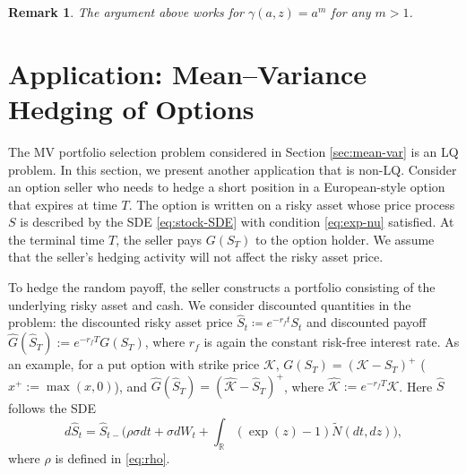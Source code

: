 \documentclass[11pt]{article}
\newtheorem{remark}{Remark}
\newcommand{\1}{\mathbbm{1}}
\begin{document}
\begin{remark}
The argument above works for $\gamma(a,z) = a^m$ for any $m >1$. %
\end{remark}

\section{Application: Mean--Variance Hedging of Options}\label{sec:MV-hedge}
The MV portfolio selection problem considered in Section \ref{sec:mean-var} is an LQ problem. In this section, we present another application that is non-LQ. Consider an option seller who needs to hedge a short position in a European-style option that expires at time $T$. The option is written on a risky asset whose price process $S$ is described by the SDE \eqref{eq:stock-SDE} with condition \eqref{eq:exp-nu} satisfied. At the terminal time $T$, the seller pays $G(S_T)$ to the option holder. We assume that the seller's hedging activity will not affect the risky asset price.

To hedge the random payoff, the seller constructs a portfolio consisting of the underlying risky asset and cash. We consider discounted quantities in the problem: the discounted risky asset price $\hat{S}_t\coloneqq e^{-r_ft}S_t$ and discounted payoff $\hat{G}(\hat{S}_T):=e^{-r_fT}G(S_T)$, where $r_f$ is again the constant risk-free interest rate. As an example, for a put option with strike price $\mathcal{K}$, $G(S_T)=(\mathcal{K}-S_T)^+$ ($x^+:=\max(x,0)$), and
$\hat{G}(\hat{S}_T)=(\hat{\mathcal{K}} - \hat{S}_T)^+$, where $\hat{\mathcal{K}}:=e^{-r_fT}\mathcal{K}$. Here
$\hat{S}$ follows the SDE
\begin{equation}
	d\hat{S}_t=\hat{S}_{t-}\bigg(\rho\sigma dt+ \sigma dW_t + \int_{\mathbb{R}} (\exp(z)-1) \widetilde{N}(dt, dz)\bigg),\label{eq:stock-SDE-discount}
\end{equation}
where $\rho$ is defined in \eqref{eq:rho}.
\end{document}
